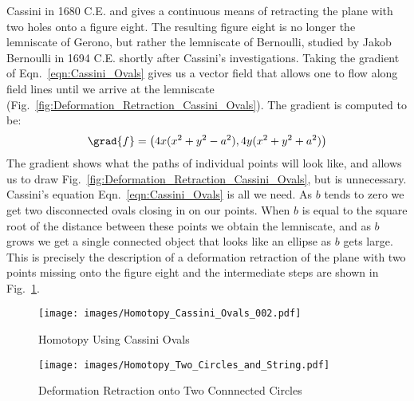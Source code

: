 \documentclass{book}                                                           %
\begin{document}
                Cassini in 1680 C.E. and gives a continuous means of retracting
                the plane with two holes onto a figure eight. The resulting
                figure eight is no longer the lemniscate of Gerono, but rather
                the lemniscate of Bernoulli, studied by Jakob Bernoulli in
                1694 C.E. shortly after Cassini's investigations.
                Taking the gradient of Eqn.~\ref{eqn:Cassini_Ovals} gives us a
                vector field that allows one to flow along field lines until we
                arrive at the lemniscate
                (Fig.~\ref{fig:Deformation_Retraction_Cassini_Ovals}). The
                gradient is computed to be:
                \begin{equation}
                    \grad{f}=\big(4x(x^{2}+y^{2}-a^{2}),4y(x^{2}+y^{2}+a^2)\big)
                \end{equation}
                The gradient shows what the paths of individual points will look
                like, and allows us to draw
                Fig.~\ref{fig:Deformation_Retraction_Cassini_Ovals}, but is
                unnecessary. Cassini's equation Eqn.~\ref{eqn:Cassini_Ovals} is
                all we need. As $b$ tends to zero we get two disconnected ovals
                closing in on our points. When $b$ is equal to the square root
                of the distance between these points we obtain the lemniscate,
                and as $b$ grows we get a single connected object that looks
                like an ellipse as $b$ gets large. This is precisely the
                description of a deformation retraction of the plane with two
                points missing onto the figure eight and the intermediate steps
                are shown in Fig.~\ref{fig:Homotopy_Cassini_Ovals}.
                \begin{figure}
                    \centering
                    \captionsetup{type=figure}
                    \texttt{[image: images/Homotopy\_Cassini\_Ovals\_002.pdf]}
                    \caption{Homotopy Using Cassini Ovals}
                    \label{fig:Homotopy_Cassini_Ovals}
                \end{figure}
                \par\hfill\par
                \begin{figure}[H]
                    \centering
                    \captionsetup{type=figure}
                    \texttt{[image: images/Homotopy\_Two\_Circles\_and\_String.pdf]}
                    \caption{Deformation Retraction onto Two Connnected Circles}
                    \label{fig:Homotopy_Two_Circles_and_String}
                \end{figure}
\end{document}
